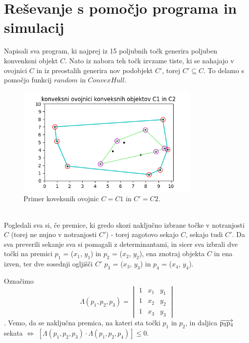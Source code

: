 \documentclass[a4paper,12pt]{article}
\begin{document}
\section{Reševanje s pomočjo programa in simulacij}
Napisali sva program, ki najprej iz 15 poljubnih točk generira poljuben konvenksni objekt $C$. Nato iz nabora teh točk izvzame tiste, ki se nahajajo v ovojnici $C$ in iz preostalih generira nov podobjekt $C'$, torej $C' \subseteq C$. To delamo s pomočjo funkcij $random$ in $ConvexHull$.
\begin{figure}[h!]
	\begin{center}
		\includegraphics[width=9cm]{Figure_4.png}
		\caption{Primer koveksnih ovojnic $C=C1$ in $C'=C2$.}
	\end{center}
\end{figure}\\
Pogledali sva si, če  premice, ki gredo skozi naključno izbrane točke v notranjosti $C$ (torej ne nujno v notranjosti $C'$) - torej zagotovo sekajo $C$, sekajo tudi $C'$.
Da sva preverili sekanje sva si pomagali z determinantami, in sicer sva izbrali dve točki na premici $p_1$ = ($x_1$, $y_1$) in $p_2$ = ($x_2$, $y_2$), ena znotraj objekta $C$ in ena izven, ter dve sosednji ogljišči $C'$ $p_3$ = ($x_3$, $y_3$) in $p_4$ = ($x_4$, $y_4$).
\begin{center}
\end{center}
Označimo $$\Lambda(p_1,p_2,p_3) = \begin{vmatrix}
     1 & x_{1} & y_{1}\\ 
     1 & x_{2} & y_{2}\\
     1 & x_{3} & y_{3} 
\end{vmatrix}$$. Vemo, da se naključna premica, na kateri sta točki $p_1$ in $p_2$, in daljica $\overrightarrow{\rm p_3p_4}$ sekata $\Leftrightarrow$ $[\Lambda(p_1,p_2,p_3)\cdot\Lambda(p_1,p_2,p_4)]\leq 0.$ \\
\end{document}
